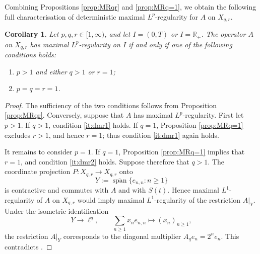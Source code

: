 \documentclass{amsart}
\let\geq\geqslant
\theoremstyle{plain}
\theoremstyle{remark}
\theoremstyle{plain}
\newtheorem{corollary}[theorem]{Corollary}
\numberwithin{equation}{section}
\newcommand{\R}{\mathbb R}
\newcommand{\1}{\mathbf 1}
\begin{document}
Combining Propositions \ref{prop:MRqr} and \ref{prop:MRq=1}, we obtain the following full characterisation of deterministic maximal $L^p$-regularity for $A$ on $X_{q,r}$. 

\begin{corollary}\label{cor:finaldet}
Let $p,q,r\in[1,\infty)$, and let $I= (0,T)$ or $I = \R_+$. The operator $A$ on $X_{q,r}$ has maximal $L^p$-regularity on $I$ if and only if one of the following conditions holds:
\begin{enumerate}[label={\rm(\roman*)}, leftmargin=*]
\item\label{it:dmr1} $p>1$ and either $q>1$ or $r=1$;
\item\label{it:dmr2} $p=q=r=1$.
\end{enumerate}
\end{corollary}

\begin{proof}
The sufficiency of the two conditions follows from Proposition
\ref{prop:MRqr}. 
Conversely, suppose that $A$ has maximal $L^p$-regularity. First let $p>1$. If $q>1$, condition \ref{it:dmr1} holds. If $q=1$, Proposition \ref{prop:MRq=1} excludes $r>1$, and hence $r=1$; thus condition \ref{it:dmr1} again holds. 

It remains to consider $p=1$. If $q=1$, Proposition \ref{prop:MRq=1} implies that $r=1$, and condition \ref{it:dmr2} holds. Suppose therefore that $q>1$.
The coordinate projection $P:X_{q,r}\to X_{q,r}$ onto
\[
        Y:=\overline{\operatorname{span}}\{e_{n,n}:n\geq1\}
\]
is contractive and commutes with $A$ and with $S(t)$. Hence maximal $L^1$-regularity of $A$ on $X_{q,r}$ would imply maximal $L^1$-regularity of the restriction $A|_Y$. Under the isometric identification
\[
        Y\to \ell^q,\qquad \sum_{n\geq1}x_ne_{n,n}\mapsto(x_n)_{n\geq1},
\]
the restriction $A|_Y$ corresponds to the diagonal multiplier
$A_qe_n=2^ne_n.$
This contradicts \cite[Example 17.4.7]{HNVW3}.
\end{proof}
\end{document}
